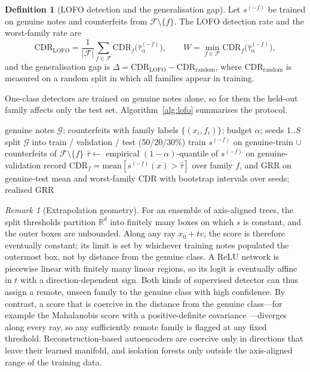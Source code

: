\documentclass{article}
\theoremstyle{definition}
\newtheorem{definition}{Definition}
\theoremstyle{remark}
\newtheorem{remark}{Remark}
\newcommand{\CDR}{\mathrm{CDR}}
\newcommand{\GRR}{\mathrm{GRR}}
\begin{document}
\begin{definition}[LOFO detection and the generalisation gap]
Let $s^{(-f)}$ be trained on genuine notes and counterfeits from $\mathcal{F}\setminus\{f\}$. The LOFO detection rate and the worst-family rate are
\begin{equation}
\CDR_{\mathrm{LOFO}}=\frac{1}{|\mathcal{F}|}\sum_{f\in\mathcal{F}}\CDR_f\!\big(\hat\tau^{(-f)}_\alpha\big),
\qquad
W=\min_{f\in\mathcal{F}}\CDR_f\!\big(\hat\tau^{(-f)}_\alpha\big),
\end{equation}
and the generalisation gap is $\Delta=\CDR_{\mathrm{LOFO}}-\CDR_{\mathrm{random}}$, where $\CDR_{\mathrm{random}}$ is measured on a random split in which all families appear in training.
\end{definition}

One-class detectors are trained on genuine notes alone, so for them the held-out family affects only the test set. Algorithm~\ref{alg:lofo} summarises the protocol.

\begin{algorithm}[t]
\caption{LOFO evaluation at a fixed genuine-rejection budget}
\label{alg:lofo}
\small
\begin{algorithmic}[1]
\Require genuine notes $\mathcal{G}$; counterfeits with family labels $\{(x_i,f_i)\}$; budget $\alpha$; seeds $1..S$
  \State split $\mathcal{G}$ into train / validation / test (50/20/30\%)
    \State train $s^{(-f)}$ on genuine-train $\cup$ counterfeits of $\mathcal{F}\setminus\{f\}$ 
    \State $\hat\tau\gets$ empirical $(1-\alpha)$-quantile of $s^{(-f)}$ on genuine-validation
    \State record $\CDR_f=\text{mean}[s^{(-f)}(x)>\hat\tau]$ over family $f$, and $\GRR$ on genuine-test
  \EndFor
\EndFor
\State \Return mean and worst-family $\CDR$ with bootstrap intervals over seeds; realised $\GRR$
\end{algorithmic}
\end{algorithm}

\begin{remark}[Extrapolation geometry]
\label{rem:extrapolation}
For an ensemble of axis-aligned trees, the split thresholds partition $\mathbb{R}^d$ into finitely many boxes on which $s$ is constant, and the outer boxes are unbounded. Along any ray $x_0+tv$, the score is therefore eventually constant; its limit is set by whichever training notes populated the outermost box, not by distance from the genuine class. A ReLU network is piecewise linear with finitely many linear regions, so its logit is eventually affine in $t$ with a direction-dependent sign. Both kinds of supervised detector can thus assign a remote, unseen family to the genuine class with high confidence. By contrast, a score that is coercive in the distance from the genuine class---for example the Mahalanobis score with a positive-definite covariance \citep{mahalanobis1936generalized}---diverges along every ray, so any sufficiently remote family is flagged at any fixed threshold. Reconstruction-based autoencoders are coercive only in directions that leave their learned manifold, and isolation forests only outside the axis-aligned range of the training data.
\end{remark}
\end{document}
